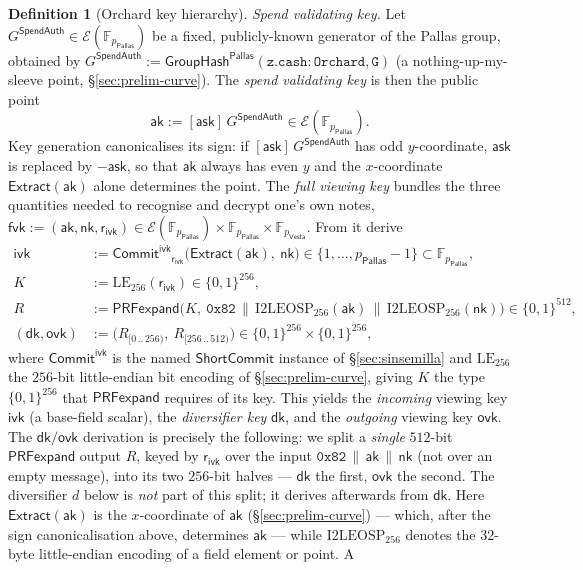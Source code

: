 \documentclass[11pt,a4paper]{article}
\theoremstyle{definition}
\newtheorem{definition}[theorem]{Definition}
\newcommand{\F}{\mathbb{F}}
\newcommand{\Pallas}{\ensuremath{\mathsf{Pallas}}}
\newcommand{\Vesta}{\ensuremath{\mathsf{Vesta}}}
\newcommand{\Ep}{\ensuremath{\mathcal{E}}}
\newcommand{\ShortCommit}{\ensuremath{\mathsf{ShortCommit}}}
\newcommand{\CommitIvk}{\ensuremath{\mathsf{Commit}^{\mathsf{ivk}}}}
\newcommand{\Extract}{\ensuremath{\mathsf{Extract}}}
\newcommand{\GroupHash}{\ensuremath{\mathsf{GroupHash}}}
\newcommand{\ask}{\ensuremath{\mathsf{ask}}}
\newcommand{\aksym}{\ensuremath{\mathsf{ak}}}
\newcommand{\nksym}{\ensuremath{\mathsf{nk}}}
\newcommand{\ivk}{\ensuremath{\mathsf{ivk}}}
\newcommand{\fvk}{\ensuremath{\mathsf{fvk}}}
\newcommand{\ovk}{\ensuremath{\mathsf{ovk}}}
\newcommand{\dk}{\ensuremath{\mathsf{dk}}}
\newcommand{\rivk}{\ensuremath{\mathsf{r_{ivk}}}}
\begin{document}
\begin{definition}[Orchard key hierarchy]
\emph{Spend validating key.} Let $G^{\mathsf{SpendAuth}} \in \Ep(\F_{p_{\Pallas}})$
be a fixed, publicly-known generator of the Pallas group, obtained by
$G^{\mathsf{SpendAuth}} := \GroupHash^{\Pallas}(\mathtt{z.cash:Orchard},
\mathtt{G})$ (a nothing-up-my-sleeve point, \S\ref{sec:prelim-curve}).
The \emph{spend validating key} is then the public point
\[
\aksym := [\ask]\,G^{\mathsf{SpendAuth}} \in \Ep(\F_{p_{\Pallas}}).
\]
Key generation canonicalises its sign: if $[\ask]\,G^{\mathsf{SpendAuth}}$
has odd $y$-coordinate, $\ask$ is replaced by $-\ask$, so that $\aksym$
always has even $y$ and the $x$-coordinate $\Extract(\aksym)$ alone
determines the point.
The \emph{full viewing key} bundles the three quantities needed to recognise
and decrypt one's own notes,
$\fvk := (\aksym, \nksym, \rivk) \in \Ep(\F_{p_{\Pallas}}) \times \F_{p_{\Pallas}} \times \F_{p_{\Vesta}}$. From it derive
\begin{align*}
\ivk &:= \CommitIvk_{\rivk}\bigl(\Extract(\aksym),\ \nksym\bigr) \in \{1, \dots, p_{\Pallas}-1\} \subset \F_{p_{\Pallas}}, \\
K &:= \mathrm{LE}_{256}(\rivk) \in \{0,1\}^{256}, \\
R &:= \mathsf{PRFexpand}\bigl(K,\ \mathtt{0x82} \,\|\, \mathrm{I2LEOSP}_{256}(\aksym) \,\|\, \mathrm{I2LEOSP}_{256}(\nksym)\bigr) \in \{0,1\}^{512}, \\
(\dk, \ovk) &:= \bigl(R_{[0\,..\,256)},\ R_{[256\,..\,512)}\bigr) \in \{0,1\}^{256} \times \{0,1\}^{256},
\end{align*}
where $\CommitIvk$ is the named $\ShortCommit$ instance of
\S\ref{sec:sinsemilla} and $\mathrm{LE}_{256}$ the $256$-bit little-endian
bit encoding of \S\ref{sec:prelim-curve}, giving $K$ the type
$\{0,1\}^{256}$ that $\mathsf{PRFexpand}$ requires of its key. This
yields the \emph{incoming} viewing key $\ivk$ (a base-field scalar), the
\emph{diversifier key} $\dk$, and the \emph{outgoing} viewing key $\ovk$.
The $\dk/\ovk$ derivation is precisely the following: we split a \emph{single}
$512$-bit $\mathsf{PRFexpand}$ output $R$, keyed by $\rivk$ over the input
$\mathtt{0x82} \,\|\, \aksym \,\|\, \nksym$ (not over an empty message),
into its two $256$-bit halves --- $\dk$ the first, $\ovk$ the second.
The diversifier $d$ below is \emph{not} part of this split; it derives
afterwards from $\dk$. Here $\Extract(\aksym)$ is the $x$-coordinate of
$\aksym$ (\S\ref{sec:prelim-curve}) --- which, after the sign
canonicalisation above, determines $\aksym$ --- while $\mathrm{I2LEOSP}_{256}$ denotes
the $32$-byte little-endian encoding of a field element or point. A

\end{definition}
\end{document}
